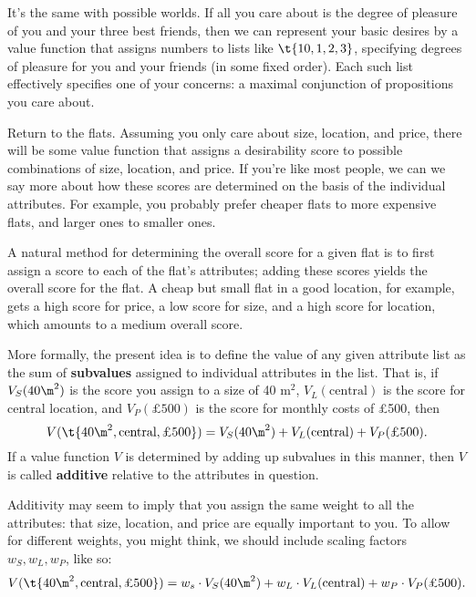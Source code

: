 
It's the same with possible worlds. If all you care about is the
degree of pleasure of you and your three best friends, then we can
represent your basic desires by a value function that assigns numbers
to lists like $\t{10, 1, 2, 3}$, specifying degrees of pleasure for
you and your friends (in some fixed order). Each such list effectively
specifies one of your concerns: a maximal conjunction of propositions
you care about.

Return to the flats. Assuming you only care about size, location, and
price, there will be some value function that assigns a desirability
score to possible combinations of size, location, and price. If you're
like most people, we can we say more about how these scores are
determined on the basis of the individual attributes. For example, you
probably prefer cheaper flats to more expensive flats, and larger ones
to smaller ones.

A natural method for determining the overall score for a given flat is to first
assign a score to each of the flat's attributes; adding these scores yields the
overall score for the flat. A cheap but small flat in a good location, for
example, gets a high score for price, a low score for size, and a high score for
location, which amounts to a medium overall score.

More formally, the present idea is to define the value of any given
attribute list as the sum of \textbf{subvalues} assigned to individual
attributes in the list. That is, if $V_{S}(40 \m^2)$ is the score you
assign to a size of 40 m$^2$, $V_{L}(\text{central})$ is the score for
central location, and $V_{P}(\text{£500})$ is the score for monthly
costs of £500, then
\[
V(\t{40 \m^2, \text{central}, \text{£500}}) = V_{S}(40 \m^2) +
V_{L}(\text{central}) + V_{P}(\text{£500}).
\]
%
If a value function $V$ is determined by adding up subvalues
in this manner, then $V$ is called \textbf{additive} relative to the
attributes in question.

Additivity may seem to imply that you assign the same weight to
all the attributes: that size, location, and price are equally
important to you. To allow for different weights, you might think, we
should include scaling factors $w_S, w_L, w_P$, like so:
\[
V(\t{40 \m^2, \text{central}, \text{£500}}) = w_s \cdot V_{S}(40 \m^2) +
w_L \cdot V_{L}(\text{central}) + w_P \cdot V_{P}(\text{£500}).
\]

